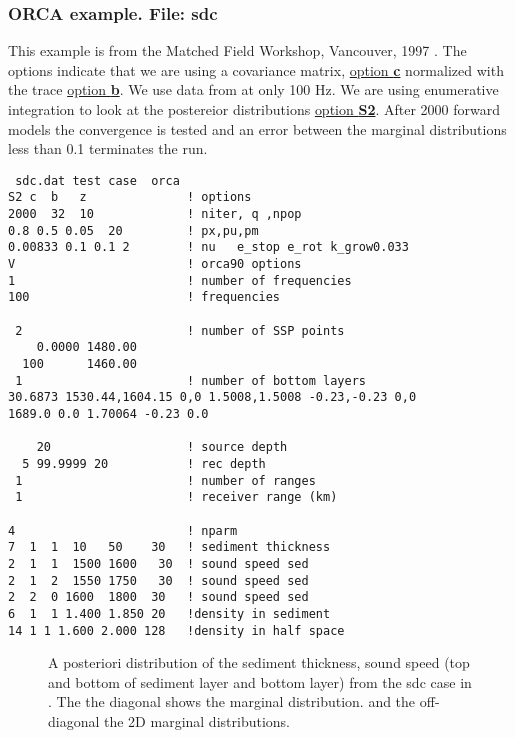 \documentclass{saclantc}
\begin{document}
\subsubsection{ORCA example. File: {\bf sdc}}

\label{se:sdc} 
This example is from the Matched Field Workshop,
Vancouver, 1997 \cite{chapman}.
The options indicate that we are using a covariance matrix, 
\underline{option {\bf c}} normalized with the trace
\underline{option {\bf b}}. We use data from at only 100 Hz. We are using enumerative integration to
look at the postereior distributions \underline{option {\bf S2}}.
After  2000 forward models the convergence is tested and an error
between the marginal distributions less
than 0.1 terminates the run.

\small
\begin{verbatim}
 sdc.dat test case  orca
S2 c  b   z              ! options 
2000  32  10             ! niter, q ,npop
0.8 0.5 0.05  20         ! px,pu,pm
0.00833 0.1 0.1 2        ! nu   e_stop e_rot k_grow0.033 
V                        ! orca90 options
1                        ! number of frequencies
100                      ! frequencies

 2                       ! number of SSP points
    0.0000 1480.00    
  100      1460.00
 1                       ! number of bottom layers
30.6873 1530.44,1604.15 0,0 1.5008,1.5008 -0.23,-0.23 0,0
1689.0 0.0 1.70064 -0.23 0.0

    20                   ! source depth
  5 99.9999 20           ! rec depth
 1                       ! number of ranges
 1                       ! receiver range (km)

4                        ! nparm                 
7  1  1  10   50    30   ! sediment thickness
2  1  1  1500 1600   30  ! sound speed sed  
2  1  2  1550 1750   30  ! sound speed sed 
2  2  0 1600  1800  30   ! sound speed sed
6  1  1 1.400 1.850 20   !density in sediment
14 1 1 1.600 2.000 128   !density in half space
\end{verbatim}
\normalsize
\begin{figure}
\epsfxsize=14cm
\centerline{}
\caption{A posteriori distribution of the sediment thickness, sound
  speed (top and bottom of sediment layer and bottom layer) from the
  sdc case in \cite{chapman}. The the diagonal shows the marginal
  distribution. and the off-diagonal the 2D marginal distributions. }
\label{fig:sdc20orca}
\end{figure}
\end{document}
